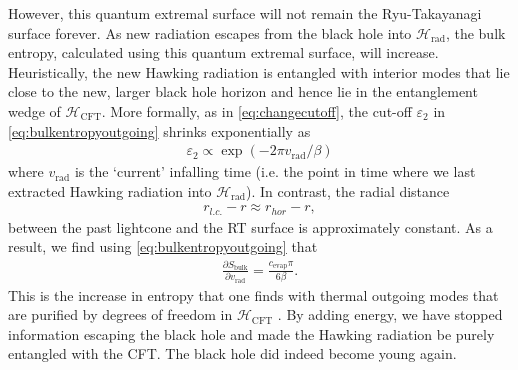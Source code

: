 \documentclass[12pt]{article}
\begin{document}
However, this quantum extremal surface will not remain the Ryu-Takayanagi surface forever. As new radiation escapes from the black hole into $\mathcal{H}_\text{rad}$, the bulk entropy, calculated using this quantum extremal surface, will increase. Heuristically, the new Hawking radiation is entangled with interior modes that lie close to the new, larger black hole horizon and hence lie in the entanglement wedge of $\mathcal{H}_\text{CFT}$. More formally, as in \eqref{eq:changecutoff}, the cut-off $\varepsilon_2$ in \eqref{eq:bulkentropyoutgoing} shrinks exponentially as
\begin{align}
\varepsilon_2 \propto \exp(-2 \pi v_\text{rad} / \beta)
\end{align}
where $v_\text{rad}$ is the `current' infalling time  (i.e. the point in time where we last extracted Hawking radiation into $\mathcal{H}_\text{rad}$). In contrast, the radial distance
\begin{align}
r_{l.c.} - r \approx r_{hor} - r,
\end{align}
between the past lightcone and the RT surface is approximately constant. As a result, we find using \eqref{eq:bulkentropyoutgoing} that
\begin{align}
\frac{\partial S_\text{bulk}}{\partial v_\text{rad}} = \frac{c_\text{evap} \pi}{6 \beta}.
\end{align}
This is the increase in entropy that one finds with thermal outgoing modes that are purified by degrees of freedom in $\mathcal{H}_\text{CFT}$ \cite{calabrese2004entanglement, calabrese2009entanglement}. By adding energy, we have stopped information escaping the black hole and made the Hawking radiation be purely entangled with the CFT. The black hole did indeed become young again.
\end{document}

